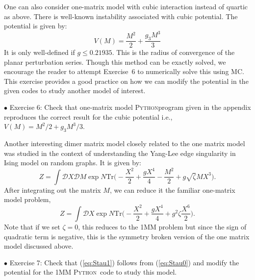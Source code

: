 \documentclass[11pt]{article}
\newcommand{\PY}{\textsc{Python}}
\begin{document}
One can also consider one-matrix model with cubic interaction instead of quartic as above. 
There is well-known instability associated with cubic potential. The potential is given by:
\begin{equation}
	V(M) = \frac{M^2}{2} + \frac{g_{3}M^3}{3}  
\end{equation}
It is only well-defined if $g \le 0.21935$. This is the radius of convergence of the planar perturbation series. 
Though this method can be exactly solved, we encourage the reader to attempt Exercise~6 to numerically solve this using MC. This exercise provides a good practice on how we can modify the potential in the given codes to study another model of interest. 


\begin{mdframed}[backgroundcolor=blue!3] 
	\textsc{} 
	$\bullet$ Exercise 6:  Check that one-matrix model \PY program given in the appendix reproduces the correct result for the cubic potential 
	i.e., $V(M) = M^2/2 + g_{3}M^3/3$.  
	\label{ex:6} 
\end{mdframed} 
Another interesting dimer matrix model closely related to the one matrix model was 
studied in the context of understanding the Yang-Lee edge singularity
\cite{Staudacher:1989fy} in Ising model on random graphs. 
It is given by: 
\begin{equation}
	\label{eq:Stau0}
	Z = \int \mathcal{D}X \mathcal{D}M \exp N \mbox{Tr}\Bigg(-\frac{X^2}{2} + \frac{gX^4}{4} - \frac{M^2}{2} + g \sqrt{\zeta} MX^3 \Bigg).
\end{equation}
After integrating out the matrix $M$, we can reduce it the familiar one-matrix model problem, 
\begin{equation}
	\label{eq:Stau1} 
	Z = \int \mathcal{D}X \exp N \mbox{Tr}\Bigg(-\frac{X^2}{2} + \frac{gX^4}{4} + g^2 \zeta  \frac{X^6}{2}   \Bigg).
\end{equation}
Note that if we set $\zeta=0$, this reduces to the 1MM problem but since the sign of 
quadratic term is negative, this is the symmetry broken version of the one matrix model 
discussed above. 
\begin{mdframed}[backgroundcolor=blue!3]  
	$\bullet$ Exercise 7: Check that (\ref{eq:Stau1}) follows from (\ref{eq:Stau0}) and modify the potential for the 1MM \PY~code to study this model. 
\end{mdframed} 
\end{document}
